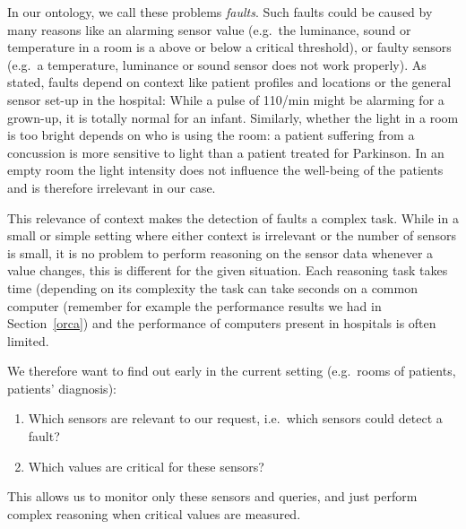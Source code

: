 In our ontology, we call these problems 
 \emph{faults}.  Such faults could be caused by many reasons like an alarming sensor value 
(e.g.\ the luminance, sound or temperature in a room is a above or below a critical threshold),
or faulty sensors (e.g.\ a temperature, luminance or sound sensor does not work properly).
As stated, faults depend on context like 
patient profiles and locations or the general sensor set-up in the hospital: 
While a pulse of 110/min might 
be alarming for a grown-up, it is totally normal for an infant. 
Similarly, whether the light in a room is too bright depends on who is using the room: a patient suffering from a concussion is more sensitive to light than a patient 
treated for Parkinson. In an empty room the light intensity does not influence the well-being of the patients and is therefore irrelevant in our case. 

This relevance of context makes the detection of faults a 
complex task. While 
in a small or simple setting where either context 
is irrelevant 
or the number of sensors is small, 
it is no problem to perform reasoning on the sensor data 
whenever a value changes, this is different for the given situation. Each reasoning task takes time 
(depending on its complexity
the task can take seconds on a common computer (remember for example the performance results we had in Section~\ref{orca})
and  %
the performance of computers present 
in  hospitals 
is often limited. 


We therefore want to find out early in the current setting 
(e.g.\ rooms of patients, patients' diagnosis): 
\begin{enumerate}
 \item Which sensors are relevant to our request, i.e.\ which sensors could detect a fault? 
 \item Which values are critical for these sensors?
\end{enumerate}
This allows us to monitor only these sensors and queries, and just perform complex reasoning when critical values are measured. 




